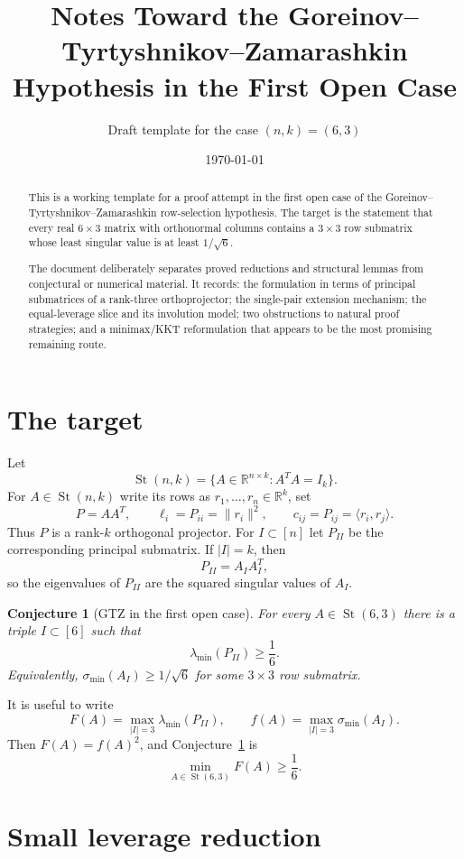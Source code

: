 \documentclass[11pt]{article}
\title{Notes Toward the Goreinov--Tyrtyshnikov--Zamarashkin Hypothesis in the First Open Case}
\author{Draft template for the case $(n,k)=(6,3)$}
\date{\today}
\numberwithin{equation}{section}
\newtheorem{conjecture}[theorem]{Conjecture}
\theoremstyle{definition}
\newcommand{\R}{\mathbb{R}}
\newcommand{\St}{\operatorname{St}}
\newcommand{\smin}{\sigma_{\min}}
\newcommand{\lmin}{\lambda_{\min}}
\begin{document}
\maketitle

\begin{abstract}
This is a working template for a proof attempt in the first open case of the
Goreinov--Tyrtyshnikov--Zamarashkin row-selection hypothesis.  The target is the
statement that every real $6\times 3$ matrix with orthonormal columns contains a
$3\times 3$ row submatrix whose least singular value is at least $1/\sqrt 6$.

The document deliberately separates proved reductions and structural lemmas from
conjectural or numerical material.  It records: the formulation in terms of
principal submatrices of a rank-three orthoprojector; the single-pair extension
mechanism; the equal-leverage slice and its involution model; two obstructions to
natural proof strategies; and a minimax/KKT reformulation that appears to be the
most promising remaining route.
\end{abstract}

\tableofcontents

\section{The target}

Let
\[
  \St(n,k)=\{A\in\R^{n\times k}: A^T A=I_k\}.
\]
For $A\in\St(n,k)$ write its rows as $r_1,\ldots,r_n\in\R^k$, set
\[
  P=AA^T,\qquad \ell_i=P_{ii}=\|r_i\|^2,\qquad c_{ij}=P_{ij}=\langle r_i,r_j\rangle.
\]
Thus $P$ is a rank-$k$ orthogonal projector.  For $I\subset[n]$ let $P_{II}$ be
the corresponding principal submatrix.  If $|I|=k$, then
\[
  P_{II}=A_I A_I^T,
\]
so the eigenvalues of $P_{II}$ are the squared singular values of $A_I$.

\begin{conjecture}[GTZ in the first open case]\label{conj:gtz63}
For every $A\in\St(6,3)$ there is a triple $I\subset[6]$ such that
\[
  \lmin(P_{II})\ge \frac16.
\]
Equivalently, $\smin(A_I)\ge 1/\sqrt6$ for some $3\times3$ row submatrix.
\end{conjecture}

It is useful to write
\[
  F(A)=\max_{|I|=3}\lmin(P_{II}),\qquad f(A)=\max_{|I|=3}\smin(A_I).
\]
Then $F(A)=f(A)^2$, and Conjecture~\ref{conj:gtz63} is
\[
  \min_{A\in\St(6,3)} F(A)\ge \frac16.
\]

\section{Small leverage reduction}
\end{document}

